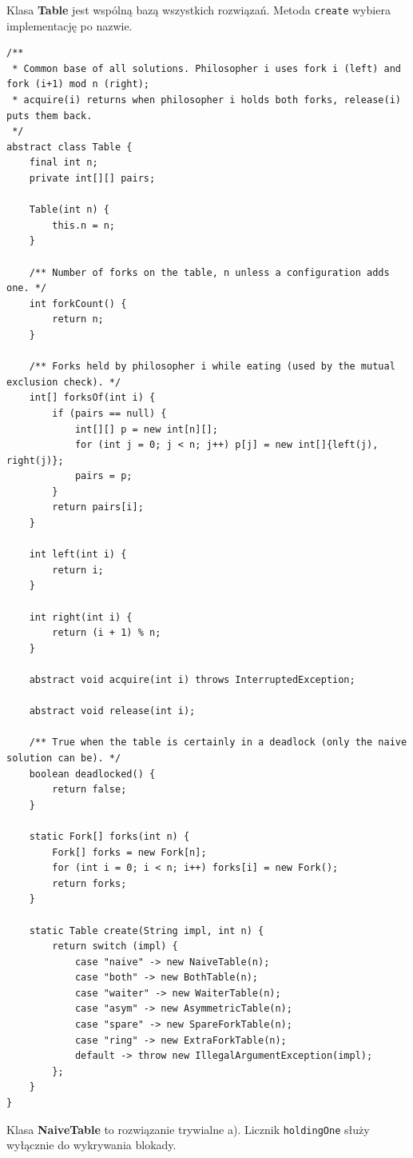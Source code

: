 \documentclass[11pt,a4paper]{article}
\begin{document}
Klasa \textbf{Table} jest wspólną bazą wszystkich rozwiązań. Metoda \texttt{create} wybiera implementację po nazwie.

\begin{lstlisting}[caption={Klasa \textbf{Table} (\texttt{src/Table.java})}]
/**
 * Common base of all solutions. Philosopher i uses fork i (left) and fork (i+1) mod n (right);
 * acquire(i) returns when philosopher i holds both forks, release(i) puts them back.
 */
abstract class Table {
    final int n;
    private int[][] pairs;

    Table(int n) {
        this.n = n;
    }

    /** Number of forks on the table, n unless a configuration adds one. */
    int forkCount() {
        return n;
    }

    /** Forks held by philosopher i while eating (used by the mutual exclusion check). */
    int[] forksOf(int i) {
        if (pairs == null) {
            int[][] p = new int[n][];
            for (int j = 0; j < n; j++) p[j] = new int[]{left(j), right(j)};
            pairs = p;
        }
        return pairs[i];
    }

    int left(int i) {
        return i;
    }

    int right(int i) {
        return (i + 1) % n;
    }

    abstract void acquire(int i) throws InterruptedException;

    abstract void release(int i);

    /** True when the table is certainly in a deadlock (only the naive solution can be). */
    boolean deadlocked() {
        return false;
    }

    static Fork[] forks(int n) {
        Fork[] forks = new Fork[n];
        for (int i = 0; i < n; i++) forks[i] = new Fork();
        return forks;
    }

    static Table create(String impl, int n) {
        return switch (impl) {
            case "naive" -> new NaiveTable(n);
            case "both" -> new BothTable(n);
            case "waiter" -> new WaiterTable(n);
            case "asym" -> new AsymmetricTable(n);
            case "spare" -> new SpareForkTable(n);
            case "ring" -> new ExtraForkTable(n);
            default -> throw new IllegalArgumentException(impl);
        };
    }
}
\end{lstlisting}

Klasa \textbf{NaiveTable} to rozwiązanie trywialne a). Licznik \texttt{holdingOne} służy wyłącznie do wykrywania blokady.
\end{document}
